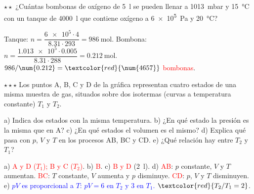 \begin{exercise}
    \(\star\star\) ¿Cuántas bombonas de oxígeno de \qty{5}{\litre} se pueden llenar a \qty{1013}{\milli\bar} y \qty{15}{\degreeCelsius} con un
    tanque de \qty{4000}{\litre} que contiene oxígeno a \qty{6e5}{\pascal} y \qty{20}{\degreeCelsius}?
    \begin{solu}
        Tanque: \(n = \dfrac{\num{6e5} \cdot 4}{\num{8.31} \cdot 293} = \qty{986}{\mole}\). Bombona: \(n = \dfrac{\num{1.013e5} \cdot \num{0.005}}{\num{8.31} \cdot 288} =
        \qty{0.212}{\mole}\). \(986/\num{0.212} = \textcolor{red}{\num{4657}}\) \textcolor{red}{bombonas}.
    \end{solu}
\end{exercise}

\begin{exercise}
    \(\star\star\star\) Los puntos A, B, C y D de la gráfica representan cuatro estados de una misma muestra de gas, situados sobre dos
    isotermas (curvas a temperatura constante) \(T_1\) y \(T_2\).
    \begin{center}
    \end{center}
    a) Indica dos estados con la misma temperatura. b) ¿En qué estado la presión es la misma que en A? c) ¿En qué estados el volumen es
    el mismo? d) Explica qué pasa con \(p\), \(V\) y \(T\) en los procesos AB, BC y CD. e) ¿Qué relación hay entre \(T_2\) y \(T_1\)?
    \begin{solu}
        a) \textcolor{red}{A y D (\(T_1\)); B y C (\(T_2\))}. b) \textcolor{red}{B}. c) \textcolor{red}{B y D} (\qty{2}{\litre}).
        d) \textcolor{red}{AB}: \(p\) constante, \(V\) y \(T\) aumentan. \textcolor{red}{BC}: \(T\) constante, \(V\) aumenta y \(p\) disminuye.
        \textcolor{red}{CD}: \(p\), \(V\) y \(T\) disminuyen. e) \textcolor{blue}{\(pV\) es proporcional a \(T\): \(pV = 6\) en \(T_2\) y \(3\) en \(T_1\).}
        \(\textcolor{red}{T_2/T_1 = 2}\).
    \end{solu}
\end{exercise}

